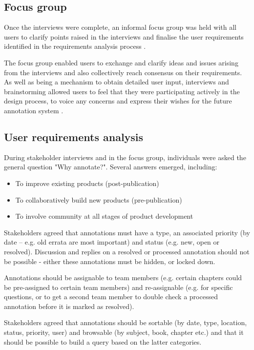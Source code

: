 \subsection{Focus group}
Once the interviews were complete, an informal focus group was held with all users to clarify points raised in the interviews and finalise the user requirements identified in the requirements analysis process \citep[p. 365]{RogersPreece}. 

The focus group enabled users to exchange and clarify ideas and issues arising from the interviews and also collectively reach consensus on their requirements. As well as being a mechanism to obtain detailed user input, interviews and brainstorming allowed users to feel that they were participating actively in the design process, to voice any concerns and express their wishes for the future annotation system \citep[p. 365]{RogersPreece}. 

\subsection{User requirements analysis}
During stakeholder interviews and in the focus group, individuals were asked the general question "Why annotate?". Several answers emerged, including: 
\begin{itemize}
 \item To improve existing products (post-publication)
 \item To collaboratively build new products (pre-publication)
 \item To involve community at all stages of product development
\end{itemize}

Stakeholders agreed that annotations must have a type, an associated priority (by date – e.g. old errata are most important) and status (e.g. new, open or resolved). Discussion and replies on a resolved or processed annotation should not be possible - either these annotations must be hidden, or locked down. 

Annotations should be assignable to team members (e.g. certain chapters could be pre-assigned to certain team members) and re-assignable (e.g. for specific questions, or to get a second team member to double check a processed annotation before it is marked as resolved).

Stakeholders agreed that annotations should be sortable (by date, type, location, status, priority, user) and browsable (by subject, book, chapter etc.) and that it should be possible to build a query based on the latter categories.

